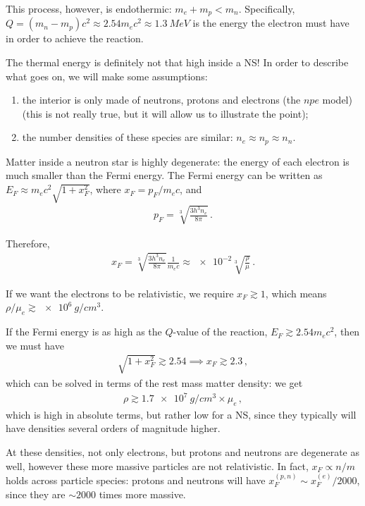 \documentclass[main.tex]{subfiles}
\begin{document}
This process, however, is endothermic: \(m_e + m_p < m_n \). 
Specifically, \(Q = (m_n - m_p)c^2 \approx 2.54 m_e c^2\approx \SI{1.3}{MeV}\) is the energy the electron must have in order to achieve the reaction. 

The thermal energy is definitely not that high inside a NS!
In order to describe what goes on, we will make some assumptions:
\begin{enumerate}
    \item the interior is only made of neutrons, protons and electrons (the \(npe\) model) (this is not really true, but it will allow us to illustrate the point);
    \item the number densities of these species are similar: \(n_e \approx n_p \approx n_n\). 
\end{enumerate}

Matter inside a neutron star is highly degenerate: the energy of each electron is much smaller than the Fermi energy.
The Fermi energy can be written as \(E_F \approx m_e c^2 \sqrt{1 + x_F^2}\), where \(x_F = p_F / m_ec\), and 
%
\begin{align}
p_F = \sqrt[3]{\frac{3 h^3 n_e}{8 \pi }}
\,.
\end{align}

Therefore, 
%
\begin{align}
x_F = \sqrt[3]{\frac{3 h^3 n_e}{8 \pi }} \frac{1}{m_e c}
\approx \num{e-2} \sqrt[3]{\frac{\rho}{\mu }}
\,.
\end{align}

If we want the electrons to be relativistic, we require \(x_F \gtrsim 1\), which means \(\rho / \mu _e \gtrsim \SI{e6}{g / cm^3}\). 

If the Fermi energy is as high as the \(Q\)-value of the reaction, \(E_F \gtrsim \num{2.54} m_e c^2\), then we must have 
%
\begin{align}
\sqrt{1 + x_F^2} \gtrsim \num{2.54} \implies x_F \gtrsim \num{2.3}
\,,
\end{align}
%
which can be solved in terms of the rest mass matter density: we get 
%
\begin{align}
\rho \gtrsim \SI{1.7e7}{g / cm^3} \times \mu _e
\,,
\end{align}
%
which is high in absolute terms, but rather low for a NS, since they typically will have densities several orders of magnitude higher. 

At these densities, not only electrons, but protons and neutrons are degenerate as well, however these more massive particles are not relativistic. 
In fact, \(x_F \propto n / m\) holds across particle species: protons and neutrons will have \(x_F^{(p, n)} \sim x_F^{(e)} / 2000 \), since they are \(\sim 2000\) times more massive. 
\end{document}
